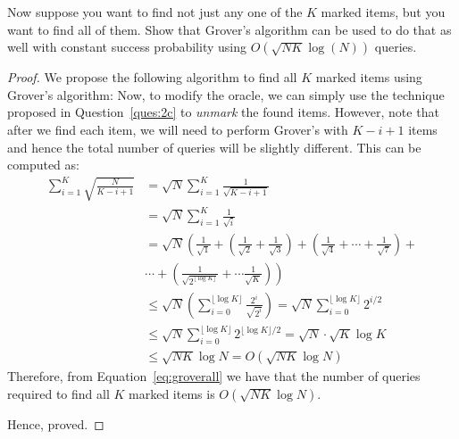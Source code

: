 \begin{solution}[label=ques:3c]
  \begin{question}
    Now suppose you want to find not just any one of the $K$ marked items, but you want to find all of them.  Show that Grover's algorithm can be used to do that as well with constant success probability using $O({\sqrt{NK} \log{(N)}})$ queries.
  \end{question}
  \tcblower{}
  \begin{proof}[Proof]
    We propose the following algorithm to find all $K$ marked items using Grover's algorithm:
    Now, to modify the oracle, we can simply use the technique proposed in Question~\ref{ques:2c} to \textit{unmark} the found items. However, note that after we find each item, we will need to perform Grover's with $K - i + 1$ items and hence the total number of queries will be slightly different. This can be computed as:
    \begin{equation}
      \begin{split}
        \sum_{i=1}^K \sqrt{\frac{N}{K - i + 1}} &= \sqrt{N}\sum_{i=1}^K\frac{1}{\sqrt{K - i + 1}}\\
        &= \sqrt{N}\sum_{i=1}^K\frac{1}{\sqrt{i}}\\
        &= \sqrt{N}\left(\frac{1}{\sqrt{1}} + \left(\frac{1}{\sqrt{2}} + \frac{1}{\sqrt{3}}\right) + \left(\frac{1}{\sqrt{4}} + \cdots + \frac{1}{\sqrt{7}}\right) + \right.\\
        &\left.\cdots + \left(\frac{1}{\sqrt{2^{\lfloor\log{K}\rfloor}}} + \cdots \frac{1}{\sqrt{K}}\right)\right)\\
        &\leq \sqrt{N}\left(\sum_{i=0}^{\lfloor\log{K}\rfloor}\frac{2^i}{\sqrt{2^i}}\right) = \sqrt{N}\sum_{i=0}^{\lfloor\log{K}\rfloor}2^{i/2}\\
        &\leq \sqrt{N}\sum_{i=0}^{\lfloor\log{K}\rfloor}2^{\lfloor\log{K}\rfloor/2} = \sqrt{N}\cdot \sqrt{K}\log{K}\\
        &\leq \sqrt{NK}\log{N} = O\left(\sqrt{NK}\log{N}\right)
      \end{split}
      \label{eq:groverall}
    \end{equation}
    Therefore, from Equation~\ref{eq:groverall} we have that the number of queries required to find all $K$ marked items is $O(\sqrt{NK}\log{N})$.\par
    Hence, proved.
  \end{proof}
\end{solution}
